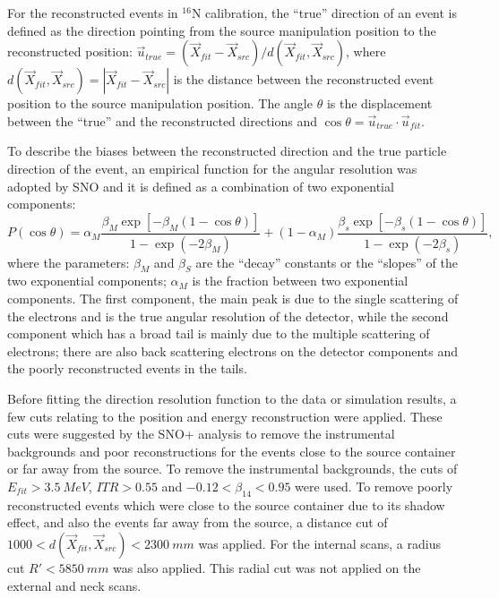 For the reconstructed events in $^{16}$N calibration, the ``true'' direction of an event is defined as the direction pointing from the source manipulation position to the reconstructed position: $\vec{u}_{true} = (\vec{X}_{fit}-\vec{X}_{src})/d(\vec{X}_{fit},\vec{X}_{src})$, where $d(\vec{X}_{fit},\vec{X}_{src})=|\vec{X}_{fit}-\vec{X}_{src}|$ is the distance between the reconstructed event position to the source manipulation position. The angle $\theta$ is the displacement between the ``true'' and the reconstructed directions and $\cos\theta=\vec{u}_{true}\cdot \vec{u}_{fit}$.

To describe the biases between the reconstructed direction and the true particle direction of the event, an empirical function for the angular resolution was adopted by SNO\cite{boulay2004direct} and it is defined as a combination of two exponential components:
\begin{equation}
P(\cos\theta)=\alpha_M\frac{\beta_M\exp[-\beta_M(1-\cos\theta)]}{1-\exp(-2\beta_M)}+(1-\alpha_M)\frac{\beta_s\exp[-\beta_s(1-\cos\theta)]}{1-\exp(-2\beta_s)},
\end{equation}
where the parameters: $\beta_M$ and $\beta_S$ are the ``decay'' constants or the ``slopes'' of the two exponential components; $\alpha_M$ is the fraction between two exponential components. The first component, the main peak is due to the single scattering of the electrons and is the true angular resolution of the detector, while the second component which has a broad tail is mainly due to the multiple scattering of electrons; there are also back scattering electrons on the detector components and the poorly reconstructed events in the tails\cite{boulay2004direct}.

Before fitting the direction resolution function to the data or simulation results, a few cuts relating to the position and energy reconstruction were applied. These cuts were suggested by the SNO+ analysis to remove the instrumental backgrounds and poor reconstructions for the events close to the source container or far away from the source. To remove the instrumental backgrounds, the cuts of $E_{fit}>3.5~MeV$, $ITR>0.55$ and $-0.12<\beta_{14}<0.95$ were used. To remove poorly reconstructed events which were close to the source container due to its shadow effect, and also the events far away from the source, a distance cut of $1000<d(\vec{X}_{fit},\vec{X}_{src})<2300~mm$ was applied. For the internal scans, a radius cut $R'<5850~mm$ was also applied. This radial cut was not applied on the external and neck scans\cite{waterunidoc}.

